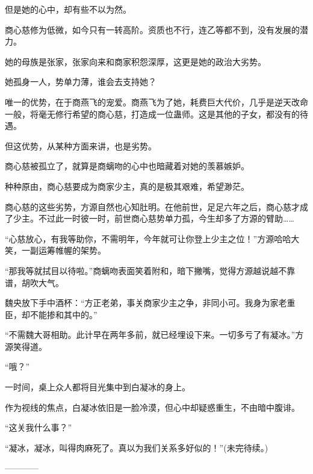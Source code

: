 \begin{this_body}
但是她的心中，却有些不以为然。

商心慈修为低微，如今只有一转高阶。资质也不行，连乙等都不到，没有发展的潜力。

她的母族是张家，张家向来和商家积怨深厚，这更是她的政治大劣势。

她孤身一人，势单力薄，谁会去支持她？

唯一的优势，在于商燕飞的宠爱。商燕飞为了她，耗费巨大代价，几乎是逆天改命一般，将毫无修行希望的商心慈，打造成一位蛊师。这是其他的子女，都没有的待遇。

但这优势，从某种方面来讲，也是劣势。

商心慈被孤立了，就算是商螭吻的心中也暗藏着对她的羡慕嫉妒。

种种原由，商心慈要成为商家少主，真的是极其艰难，希望渺茫。

商心慈的这些劣势，方源自然也心知肚明。在他前世，足足六年之后，商心慈才成了少主。不过此一时彼一时，前世商心慈势单力孤，今生却多了方源的臂助……

“心慈放心，有我等助你，不需明年，今年就可让你登上少主之位！”方源哈哈大笑，一副运筹帷幄的架势。

“那我等就拭目以待啦。”商螭吻表面笑着附和，暗下撇嘴，觉得方源越说越不靠谱，胡吹大气。

魏央放下手中酒杯：“方正老弟，事关商家少主之争，非同小可。我身为家老重臣，却不能掺和其中的。”

“不需魏大哥相助。此计早在两年多前，就已经埋设下来。一切多亏了有凝冰。”方源笑得道。

“哦？”

一时间，桌上众人都将目光集中到白凝冰的身上。

作为视线的焦点，白凝冰依旧是一脸冷漠，但心中却疑惑重生，不由暗中腹诽。

“这关我什么事？”

“凝冰，凝冰，叫得肉麻死了。真以为我们关系多好似的！”(未完待续。)

------------

\end{this_body}

